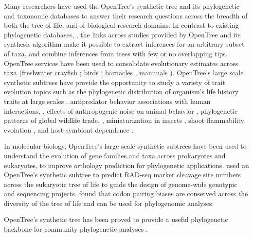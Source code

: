\documentclass[oupdraft]{sysbio_sse}
\begin{document}
Many researchers have used the OpenTree's synthetic tree and its phylogenetic and taxonomic databases to answer their research questions across the breadth of both the tree of life, and of biological research domains.
In contrast to existing phylogenetic databases, \citep{piel2000treebase}, the links across studies provided by OpenTree and its synthesis algorithm make it possible to extract inferences for an arbitrary subset of taxa, and combine inferences from trees with few or no overlapping tips.
OpenTree services have been used to consolidate evolutionary estimates across taxa (freshwater crayfish \citep{owen2015synthetic}; birds \citep{brown2017development}; barnacles \citep{ewers2019towards, ewers2019testing}, mammals \citep{uyeda2017evolution}).
OpenTree's large scale synthetic subtrees have provide the opportunity to study
a variety of trait evolution topics such as the phylogenetic distribution of organism's life history traits at large scales \citep{tarka2018sex, healy2019animal, capdevila2020longevity}.
antipredator behavior associations with human interactions, \citep{geffroy2020evolutionary}, effects of anthropogenic noise on
animal behavior  \citep{kunc2019effects}, phylogenetic patterns of global wildlife trade,  \citep{fukushima2020global},  miniaturization in insects \citep{polilov2017scaling},
shoot flammability evolution \citep{cui2020shoot}, and host-symbiont dependence \citep{fisher2017evolution}.

In molecular biology, OpenTree's large scale synthetic subtrees \citet{boeckmann2015quest}
have been used to understand the evolution
of gene families and taxa across prokaryotes and eukaryotes, to improve orthology prediction for phylogenetic applications.
\citet{herrera2015predicting} used an OpenTree's synthetic subtree to predict RAD-seq marker cleavage site numbers
across the eukaryotic tree of life to guide the design of genome-wide genotypic and
sequencing projects. \citet{miller2020codonpairs} found that codon pairing biases are conserved across the diversity of the tree of life and can be used for phylogenomic analyses.

OpenTree's synthetic tree has been proved to provide a useful phylogenetic backbone for community phylogenetic analyses \citep{li2019common, jantzen2019effects}.


\end{document}

